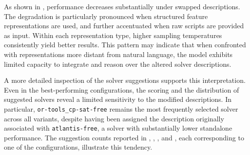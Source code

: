 \documentclass[../../main]{subfiles}
\begin{document}
\begin{table}[ht]
    \centering
    \caption{Analysis over configurations involving swapped solver descriptions, evaluated with \texttt{gpt-oss-120b}. Columns are computed as in , after mapping each suggested solver to the solver from which the description was taken.}
    \label{tab:CombinedSwapped}
\end{table}

As shown in , performance decreases substantially under swapped descriptions. The degradation is particularly pronounced when structured feature representations are used, and further accentuated when raw scripts are provided as input. Within each representation type, higher sampling temperatures consistently yield better results. This pattern may indicate that when confronted with representations more distant from natural language, the model exhibits limited capacity to integrate and reason over the altered solver descriptions.

A more detailed inspection of the solver suggestions supports this interpretation. Even in the best-performing configurations, the scoring and the distribution of suggested solvers reveal a limited sensitivity to the modified descriptions. In particular, \texttt{or-tools\_cp-sat-free} remains the most frequently selected solver across all variants, despite having been assigned the description originally associated with \texttt{atlantis-free}, a solver with substantially lower standalone performance. The suggestion counts reported in , , ,  and , each corresponding to one of the configurations, illustrate this tendency.
\end{document}

